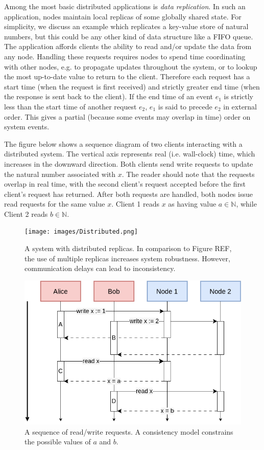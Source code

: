 Among the most basic distributed applications is \emph{data
replication}. In such an application, nodes maintain local replicas of
some globally shared state. For simplicity, we discuss an example
which replicates a key-value store of natural numbers, but this could
be any other kind of data structure like a FIFO queue. The application
affords clients the ability to read and/or update the data from any
node. Handling these requests requires nodes to spend time
coordinating with other nodes, e.g. to propagate updates throughout
the system, or to lookup the most up-to-date value to return to the
client. Therefore each request has a start time (when the request is
first received) and strictly greater end time (when the response is
sent back to the client). If the end time of an event $e_1$ is
strictly less than the start time of another request $e_2$, $e_1$ is
said to precede $e_2$ in external order. This gives a partial (because
some events may overlap in time) order on system events.

The figure below shows a sequence diagram of two clients interacting
with a distributed system. The vertical axis represents real
(i.e. wall-clock) time, which increases in the downward
direction. Both clients send write requests to update the natural
number associated with $x$. The reader should note that the requests
overlap in real time, with the second client's request accepted before
the first client's request has returned. After both requests are
handled, both nodes issue read requests for the same value $x$. Client
1 reads $x$ as having value $a \in \mathbb{N}$, while Client 2 reads
$b \in \mathbb{N}$.

\begin{figure}
  \texttt{[image: images/Distributed.png]}
  \caption{A system with distributed replicas. In comparison to Figure REF, the use of multiple replicas increases system robustness. However, communication delays can lead to inconsistency.}
\end{figure}

\begin{figure}
  \includegraphics[scale=0.6]{images/Requests.png}
  \caption{A sequence of read/write requests. A consistency model constrains the possible values of $a$ and $b$.}
\end{figure}

